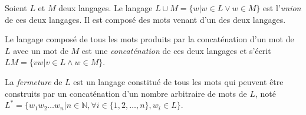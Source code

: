 Soient $L$ et $M$ deux langages. Le langage $L \cup M = \{w | w \in L\vee w \in M\}$ est l'\emph{union} de ces deux langages. Il est composé des mots venant d'un des deux langages.

Le langage composé de tous les mots produits par la concaténation d'un mot de $L$ avec un mot de $M$ est une \emph{concaténation} de ces deux langages et s'écrit $LM = \{vw | v \in L \wedge w \in M\}$.

La \emph{fermeture} de $L$ est un langage constitué de tous les mots qui peuvent être construits par un concaténation d'un nombre arbitraire de mots de $L$, noté $L^*=\{w_1w_2\dots w_n|n\in \mathbb{N},\forall i \in \{1,2,\dots,n\}, w_i \in L\}$.
